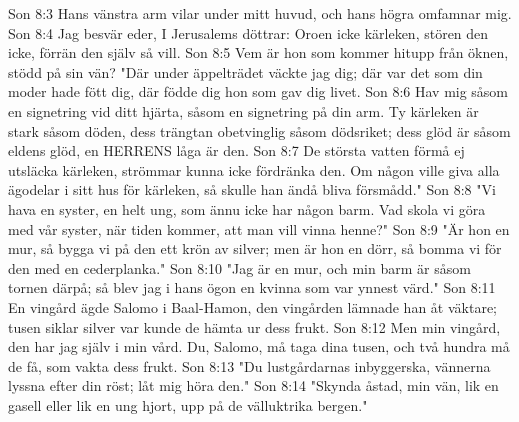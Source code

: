 Son 8:3  Hans vänstra arm vilar under mitt huvud, och hans högra omfamnar mig.
Son 8:4  Jag besvär eder, I Jerusalems döttrar: Oroen icke kärleken, stören den icke, förrän den själv så vill.
Son 8:5  Vem är hon som kommer hitupp från öknen, stödd på sin vän? "Där under äppelträdet väckte jag dig; där var det som din moder hade fött dig, där födde dig hon som gav dig livet.
Son 8:6  Hav mig såsom en signetring vid ditt hjärta, såsom en signetring på din arm. Ty kärleken är stark såsom döden, dess trängtan obetvinglig såsom dödsriket; dess glöd är såsom eldens glöd, en HERRENS låga är den.
Son 8:7  De största vatten förmå ej utsläcka kärleken, strömmar kunna icke fördränka den. Om någon ville giva alla ägodelar i sitt hus för kärleken, så skulle han ändå bliva försmådd."
Son 8:8  "Vi hava en syster, en helt ung, som ännu icke har någon barm. Vad skola vi göra med vår syster, när tiden kommer, att man vill vinna henne?"
Son 8:9  "Är hon en mur, så bygga vi på den ett krön av silver; men är hon en dörr, så bomma vi för den med en cederplanka."
Son 8:10  "Jag är en mur, och min barm är såsom tornen därpå; så blev jag i hans ögon en kvinna som var ynnest värd."
Son 8:11  En vingård ägde Salomo i Baal-Hamon, den vingården lämnade han åt väktare; tusen siklar silver var kunde de hämta ur dess frukt.
Son 8:12  Men min vingård, den har jag själv i min vård. Du, Salomo, må taga dina tusen, och två hundra må de få, som vakta dess frukt.
Son 8:13  "Du lustgårdarnas inbyggerska, vännerna lyssna efter din röst; låt mig höra den."
Son 8:14  "Skynda åstad, min vän, lik en gasell eller lik en ung hjort, upp på de välluktrika bergen."


